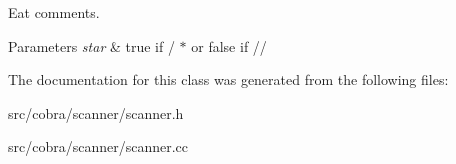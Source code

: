 Eat comments. 


\begin{DoxyParams}{Parameters}
{\em star} & true if / $\ast$ or false if // \\
\hline
\end{DoxyParams}


The documentation for this class was generated from the following files\+:\begin{DoxyCompactItemize}
\item 
src/cobra/scanner/scanner.\+h\item 
src/cobra/scanner/scanner.\+cc\end{DoxyCompactItemize}
